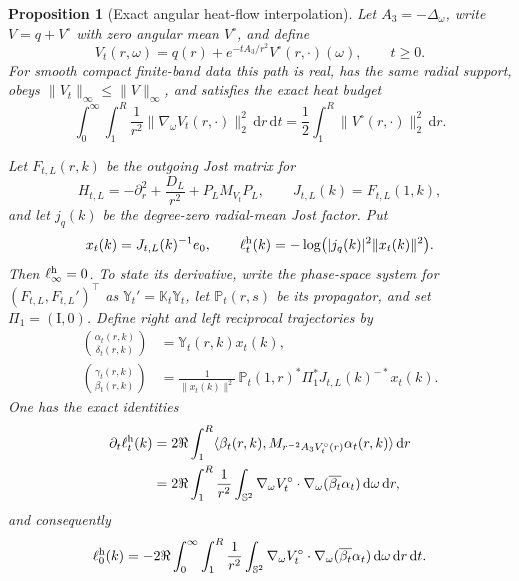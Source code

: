 \documentclass[11pt]{article}
\newcommand{\Id}{\mathrm I}
\newcommand{\dd}{\,\mathrm d}
\newtheorem{proposition}[theorem]{Proposition}
\theoremstyle{definition}
\theoremstyle{remark}
\begin{document}
\begin{proposition}[Exact angular heat-flow interpolation]
\label{prop:angular-heat-flow-interpolation}
Let $A_3=-\Delta_\omega$, write $V=q+V^\circ$ with zero angular mean
$V^\circ$, and define
\begin{equation}
 V_t(r,\omega)=q(r)+e^{-tA_3/r^2}V^\circ(r,\cdot)(\omega),
 \qquad t\geq0.
 \label{eq:angular-heat-flow-potential}
\end{equation}
For smooth compact finite-band data this path is real, has the same radial
support, obeys $\|V_t\|_\infty\leq\|V\|_\infty$, and satisfies the exact heat
budget
\begin{equation}
 \int_0^\infty\int_1^R\frac1{r^2}
  \|\nabla_\omega V_t(r,\cdot)\|_2^2\dd r\dd t
 =\frac12\int_1^R\|V^\circ(r,\cdot)\|_2^2\dd r.
 \label{eq:exact-angular-heat-budget}
\end{equation}

Let $F_{t,L}(r,k)$ be the outgoing Jost matrix for
\begin{equation}
 H_{t,L}=-\partial_r^2+\frac{D_L}{r^2}+P_LM_{V_t}P_L,
 \qquad J_{t,L}(k)=F_{t,L}(1,k),
 \label{eq:heat-flow-finite-operator}
\end{equation}
and let $j_q(k)$ be the degree-zero radial-mean Jost factor.  Put
\begin{equation}
 x_t(k)=J_{t,L}(k)^{-1}e_0,
 \qquad
 \ell_t^{\rm h}(k)
 =-\log\bigl(|j_q(k)|^2\|x_t(k)\|^2\bigr).
 \label{eq:heat-flow-selected-loss}
\end{equation}
Then $\ell_\infty^{\rm h}=0$.  To state its derivative, write the phase-space
system for $(F_{t,L},F_{t,L}')^\top$ as
$\mathbb Y_t'=\mathbb K_t\mathbb Y_t$, let
$\mathbb P_t(r,s)$ be its propagator, and set $\Pi_1=(\Id,0)$.  Define right
and left reciprocal trajectories by
\begin{align}
 \binom{\alpha_t(r,k)}{\delta_t(r,k)}
 &=\mathbb Y_t(r,k)x_t(k),
 \label{eq:heat-right-trajectory}\\
 \binom{\gamma_t(r,k)}{\beta_t(r,k)}
 &=\frac1{\|x_t(k)\|^2}\,
   \mathbb P_t(1,r)^*\Pi_1^*J_{t,L}(k)^{-*}x_t(k).
 \label{eq:heat-left-trajectory}
\end{align}
One has the exact identities
\begin{align}
 \partial_t\ell_t^{\rm h}(k)
 &=2\Re\int_1^R
   \langle\beta_t(r,k),M_{r^{-2}A_3V_t^\circ(r)}
          \alpha_t(r,k)\rangle\dd r
 \label{eq:heat-loss-variation}\\
 &=2\Re\int_1^R\frac1{r^2}\int_{\mathbb S^2}
   \nabla_\omega V_t^\circ\cdot
   \nabla_\omega(\overline{\beta_t}\alpha_t)
   \dd\omega\dd r,
 \label{eq:heat-loss-product-gradient}
\end{align}
and consequently
\begin{equation}
 \ell_0^{\rm h}(k)
 =-2\Re\int_0^\infty\int_1^R\frac1{r^2}
   \int_{\mathbb S^2}
   \nabla_\omega V_t^\circ\cdot
   \nabla_\omega(\overline{\beta_t}\alpha_t)
   \dd\omega\dd r\dd t.
 \label{eq:exact-heat-flow-work}
\end{equation}


\end{proposition}
\end{document}
